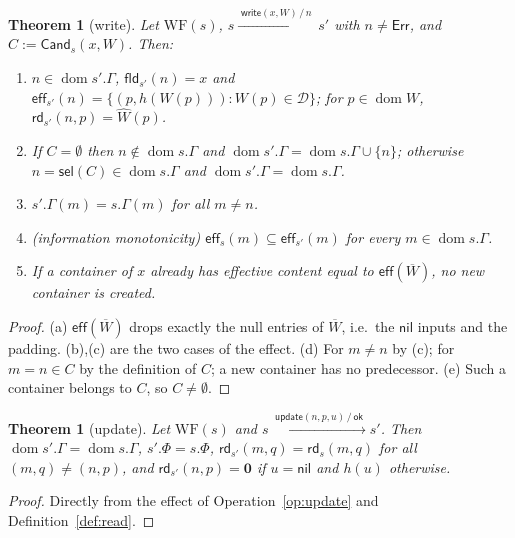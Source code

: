 \documentclass[11pt,a4paper]{article}
\theoremstyle{definition}
\theoremstyle{plain}
\newtheorem{theorem}[definition]{Theorem}
\theoremstyle{remark}
\newcommand{\Dat}{\mathcal{D}}
\newcommand{\nul}{\mathbf{0}}
\newcommand{\nil}{\mathsf{nil}}
\newcommand{\Err}{\mathsf{Err}}
\newcommand{\ok}{\mathsf{ok}}
\newcommand{\dom}{\operatorname{dom}}
\newcommand{\rd}{\mathsf{rd}}
\newcommand{\eff}{\mathsf{eff}}
\newcommand{\fld}{\mathsf{fld}}
\newcommand{\Cand}{\mathsf{Cand}}
\newcommand{\sel}{\mathsf{sel}}
\newcommand{\tr}[2]{\xrightarrow{\;#1\,/\,#2\;}}
\begin{document}
\begin{theorem}[\textsf{write}]\label{thm:write}
Let $\mathrm{WF}(s)$, $s\tr{\textsf{write}(x,W)}{n}s'$ with $n\neq\Err$, and $C:=\Cand_s(x,W)$. Then:
\begin{enumerate}[label=(\alph*),leftmargin=*]
\item $n\in\dom s'.\Gamma$, $\fld_{s'}(n)=x$ and $\eff_{s'}(n)=\{(p,h(W(p))) : W(p)\in\Dat\}$; for $p\in\dom W$, $\rd_{s'}(n,p)=\widehat W(p)$.
\item If $C=\emptyset$ then $n\notin\dom s.\Gamma$ and $\dom s'.\Gamma=\dom s.\Gamma\cup\{n\}$; otherwise $n=\sel(C)\in\dom s.\Gamma$ and $\dom s'.\Gamma=\dom s.\Gamma$.
\item $s'.\Gamma(m)=s.\Gamma(m)$ for all $m\neq n$.
\item (information monotonicity) $\eff_s(m)\subseteq\eff_{s'}(m)$ for every $m\in\dom s.\Gamma$.
\item If a container of $x$ already has effective content equal to $\eff(\overline W)$, no new container is created.
\end{enumerate}
\end{theorem}
\begin{proof}
(a) $\eff(\overline W)$ drops exactly the null entries of $\overline W$, i.e.\ the $\nil$ inputs and the padding. (b),(c) are the two cases of the effect. (d) For $m\neq n$ by (c); for $m=n\in C$ by the definition of $C$; a new container has no predecessor. (e) Such a container belongs to $C$, so $C\neq\emptyset$.
\end{proof}

\begin{theorem}[\textsf{update}]\label{thm:update}
Let $\mathrm{WF}(s)$ and $s\tr{\textsf{update}(n,p,u)}{\ok}s'$. Then $\dom s'.\Gamma=\dom s.\Gamma$, $s'.\Phi=s.\Phi$,
$\rd_{s'}(m,q)=\rd_s(m,q)$ for all $(m,q)\neq(n,p)$, and $\rd_{s'}(n,p)=\nul$ if $u=\nil$ and $h(u)$ otherwise.
\end{theorem}
\begin{proof}
Directly from the effect of Operation~\ref{op:update} and Definition~\ref{def:read}.
\end{proof}
\end{document}
